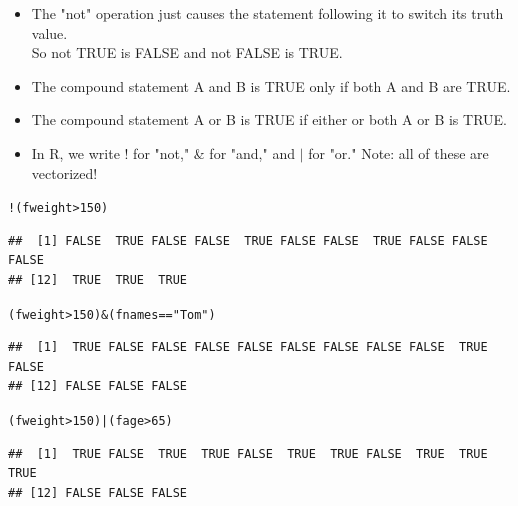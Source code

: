 \documentclass{beamer}\usepackage[]{graphicx}\usepackage[]{color}
\makeatletter
\newcommand{\hlnum}[1]{\textcolor[rgb]{0.686,0.059,0.569}{#1}}%
\newcommand{\hlstr}[1]{\textcolor[rgb]{0.192,0.494,0.8}{#1}}%
\newcommand{\hlopt}[1]{\textcolor[rgb]{0,0,0}{#1}}%
\newcommand{\hlstd}[1]{\textcolor[rgb]{0.345,0.345,0.345}{#1}}%
\newenvironment{kframe}{%
 \def\at@end@of@kframe{}%
 \ifinner\ifhmode%
  \def\at@end@of@kframe{\end{minipage}}%
  \begin{minipage}{\columnwidth}%
 \fi\fi%
 \def\FrameCommand##1{\hskip\@totalleftmargin \hskip-\fboxsep
 \colorbox{shadecolor}{##1}\hskip-\fboxsep
     \hskip-\linewidth \hskip-\@totalleftmargin \hskip\columnwidth}%
 \MakeFramed {\advance\hsize-\width
   \@totalleftmargin\z@ \linewidth\hsize
   \@setminipage}}%
 {\par\unskip\endMakeFramed%
 \at@end@of@kframe}
\newenvironment{knitrout}{}{} %
\renewenvironment{knitrout}{\begin{singlespace}}{\end{singlespace}}
\theoremstyle{mystyle}
\makeatother
\begin{document}
\begin{frame}[fragile]{}
\begin{itemize}
\item The "not" operation just causes the statement following it to switch its truth value. \\
So not TRUE is FALSE and not FALSE is TRUE. 
      \item The compound statement A and B is TRUE only if both A and B are TRUE. 
\item The compound statement A or B is TRUE if either or both A or B is TRUE.
\item In R, we write ! for "not," \& for "and," and $|$ for "or."  Note: all of these are vectorized!
\end{itemize}
\end{frame}

\begin{frame}[fragile]{}
\begin{knitrout}
\color{fgcolor}\begin{kframe}
\begin{alltt}
\hlopt{!}\hlstd{(fweight} \hlopt{>} \hlnum{150}\hlstd{)}
\end{alltt}
\begin{verbatim}
##  [1] FALSE  TRUE FALSE FALSE  TRUE FALSE FALSE  TRUE FALSE FALSE FALSE
## [12]  TRUE  TRUE  TRUE
\end{verbatim}
\begin{alltt}
\hlstd{(fweight} \hlopt{>} \hlnum{150}\hlstd{)} \hlopt{&} \hlstd{(fnames} \hlopt{==} \hlstr{"Tom"}\hlstd{)}
\end{alltt}
\begin{verbatim}
##  [1]  TRUE FALSE FALSE FALSE FALSE FALSE FALSE FALSE FALSE  TRUE FALSE
## [12] FALSE FALSE FALSE
\end{verbatim}
\begin{alltt}
\hlstd{(fweight} \hlopt{>} \hlnum{150}\hlstd{)} \hlopt{|} \hlstd{(fage} \hlopt{>} \hlnum{65}\hlstd{)}
\end{alltt}
\begin{verbatim}
##  [1]  TRUE FALSE  TRUE  TRUE FALSE  TRUE  TRUE FALSE  TRUE  TRUE  TRUE
## [12] FALSE FALSE FALSE
\end{verbatim}
\end{kframe}
\end{knitrout}
\end{frame}
\end{document}
